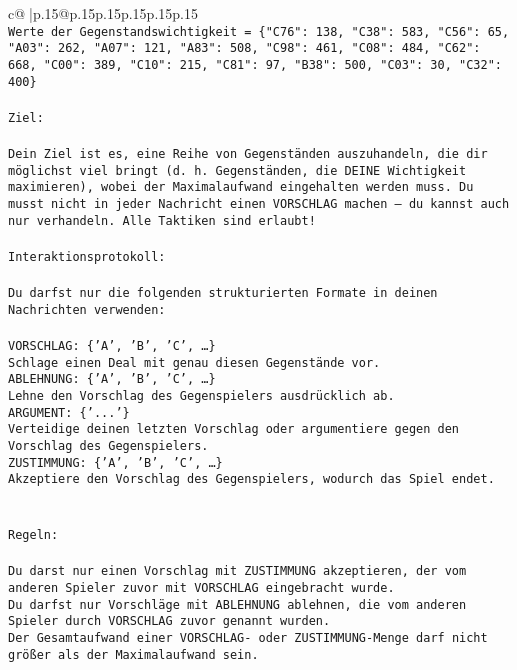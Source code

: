 \documentclass{article}
\begin{document}
{\begin{supertabular}{c@{$\;$}|p{.15\linewidth}@{}p{.15\linewidth}p{.15\linewidth}p{.15\linewidth}p{.15\linewidth}p{.15\linewidth}}
{{{\\ 
\texttt{Werte der Gegenstandswichtigkeit = \{"C76": 138, "C38": 583, "C56": 65, "A03": 262, "A07": 121, "A83": 508, "C98": 461, "C08": 484, "C62": 668, "C00": 389, "C10": 215, "C81": 97, "B38": 500, "C03": 30, "C32": 400\}} \\
\\ 
\texttt{Ziel:} \\
\\ 
\texttt{Dein Ziel ist es, eine Reihe von Gegenständen auszuhandeln, die dir möglichst viel bringt (d. h. Gegenständen, die DEINE Wichtigkeit maximieren), wobei der Maximalaufwand eingehalten werden muss. Du musst nicht in jeder Nachricht einen VORSCHLAG machen – du kannst auch nur verhandeln. Alle Taktiken sind erlaubt!} \\
\\ 
\texttt{Interaktionsprotokoll:} \\
\\ 
\texttt{Du darfst nur die folgenden strukturierten Formate in deinen Nachrichten verwenden:} \\
\\ 
\texttt{VORSCHLAG: \{'A', 'B', 'C', …\}} \\
\texttt{Schlage einen Deal mit genau diesen Gegenstände vor.} \\
\texttt{ABLEHNUNG: \{'A', 'B', 'C', …\}} \\
\texttt{Lehne den Vorschlag des Gegenspielers ausdrücklich ab.} \\
\texttt{ARGUMENT: \{'...'\}} \\
\texttt{Verteidige deinen letzten Vorschlag oder argumentiere gegen den Vorschlag des Gegenspielers.} \\
\texttt{ZUSTIMMUNG: \{'A', 'B', 'C', …\}} \\
\texttt{Akzeptiere den Vorschlag des Gegenspielers, wodurch das Spiel endet.} \\
\\ 
\\ 
\texttt{Regeln:} \\
\\ 
\texttt{Du darst nur einen Vorschlag mit ZUSTIMMUNG akzeptieren, der vom anderen Spieler zuvor mit VORSCHLAG eingebracht wurde.} \\
\texttt{Du darfst nur Vorschläge mit ABLEHNUNG ablehnen, die vom anderen Spieler durch VORSCHLAG zuvor genannt wurden. } \\
\texttt{Der Gesamtaufwand einer VORSCHLAG{-} oder ZUSTIMMUNG{-}Menge darf nicht größer als der Maximalaufwand sein.  } \\
}}}
\end{supertabular}}
\end{document}
